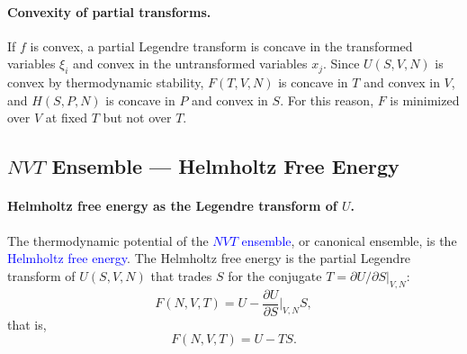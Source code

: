 \paragraph{Convexity of partial transforms.}
If $f$ is convex, a partial Legendre transform is concave in the transformed
variables $\xi_i$ and convex in the untransformed variables $x_j$. Since
$U(S,V,N)$ is convex by thermodynamic stability, $F(T,V,N)$ is concave in
$T$ and convex in $V$, and $H(S,P,N)$ is concave in $P$ and convex in $S$.
For this reason, $F$ is minimized over $V$ at fixed $T$ but not over $T$.

\subsection{$NVT$ Ensemble --- Helmholtz Free Energy}

\paragraph{Helmholtz free energy as the Legendre transform of $U$.}
The thermodynamic potential of the \textcolor{blue}{$NVT$ ensemble}, or
canonical ensemble, is the \textcolor{blue}{Helmholtz free energy}. The
Helmholtz free energy is the partial Legendre transform of $U(S,V,N)$ that
trades $S$ for the conjugate $T=\partial U/\partial S|_{V,N}$:
\begin{equation*}
    F(N,V,T)=U-\frac{\partial U}{\partial S}\bigg|_{V,N}S,
\end{equation*}
that is,
\begin{equation}
    \boxed{F(N,V,T)=U-TS.}
\end{equation}

